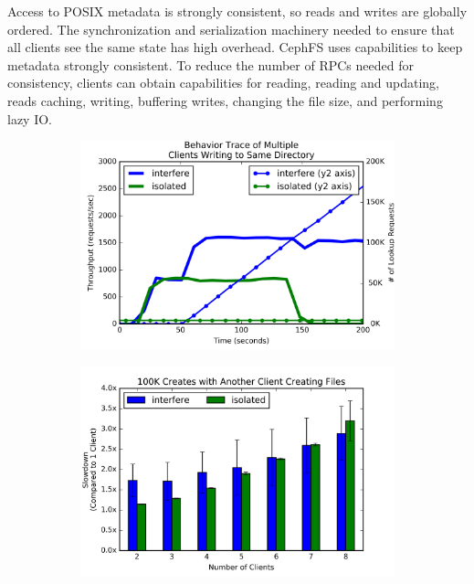 Access to POSIX metadata is strongly consistent, so reads and writes are
globally ordered. The synchronization and serialization machinery needed to
ensure that all clients see the same state has high overhead.  CephFS uses
capabilities to keep metadata strongly consistent. To reduce the number of RPCs
needed for consistency, clients can obtain capabilities for reading, reading
and updating, reads caching, writing, buffering writes, changing the file size,
and performing lazy IO.

\begin{figure}[t]
  \centering
  \begin{subfigure}[b]{.3\linewidth}
      \centering
      \includegraphics[width=1.0\linewidth]{graphs/behavior-interfere.png}
      \caption{}
      \label{fig:phy-design}
  \end{subfigure}
  \begin{subfigure}[b]{.3\linewidth}
      \centering
      \includegraphics[width=1.0\linewidth]{graphs/slowdown-interfere.png}

\end{subfigure}
\end{figure}
